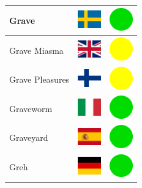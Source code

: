 \documentclass[12pt, a4paper, twoside]{report}
\begin{document}
\begin{center}
\begin{longtable}{|p{5cm}|p{2cm}|p{2cm}|}
 Grave                                                      & \includegraphics[width=1cm]{../img/flags/se} &   \includegraphics[width=1cm]{../likes/y} \\ \hline
 Grave Miasma                                               & \includegraphics[width=1cm]{../img/flags/gb} &   \includegraphics[width=1cm]{../likes/m} \\ \hline
 Grave Pleasures                                            & \includegraphics[width=1cm]{../img/flags/fi} &   \includegraphics[width=1cm]{../likes/m} \\ \hline
 Graveworm                                                  & \includegraphics[width=1cm]{../img/flags/it} &   \includegraphics[width=1cm]{../likes/y} \\ \hline
 Graveyard                                                  & \includegraphics[width=1cm]{../img/flags/es} &   \includegraphics[width=1cm]{../likes/y} \\ \hline
 Greh                                                       & \includegraphics[width=1cm]{../img/flags/de} &   \includegraphics[width=1cm]{../likes/y} \\ \hline

\end{longtable}
\end{center}
\end{document}
